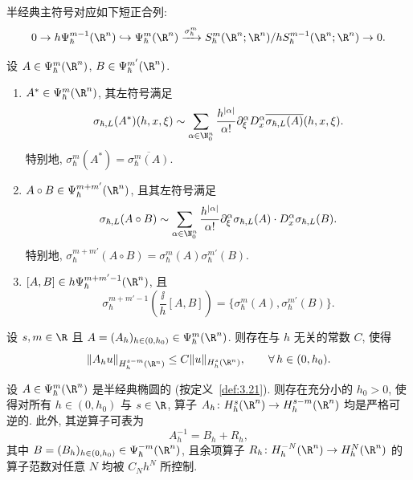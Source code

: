 半经典主符号对应如下短正合列:
\begin{equation}\label{eq:4.146}
    0 \to h \Psi_\hbar^{m-1}(\R^n) \hookrightarrow \Psi_\hbar^m(\R^n) \xrightarrow{\sigma_\hbar^m} S_\hbar^m(\R^n; \R^n) / h S_\hbar^{m-1}(\R^n; \R^n) \to 0.
\end{equation}

\begin{theorem}\label{thm:4.50}
设 $A \in \Psi_\hbar^m(\R^n)$, $B \in \Psi_\hbar^{m'}(\R^n)$.
\begin{enumerate}
    \item $A^* \in \Psi_\hbar^m(\R^n)$, 其左符号满足
    \begin{equation}\label{eq:4.147}
        \sigma_{\hbar, L}(A^*)(h, x, \xi) \sim \sum_{\alpha \in \N_0^n} \frac{h^{|\alpha|}}{\alpha!} \partial_\xi^\alpha D_x^\alpha \overline{\sigma_{\hbar, L}(A)}(h, x, \xi).
    \end{equation}
    特别地, $\sigma_\hbar^m(A^*) = \overline{\sigma_\hbar^m(A)}$.
    \item $A \circ B \in \Psi_\hbar^{m+m'}(\R^n)$, 且其左符号满足
    \begin{equation}\label{eq:4.148}
        \sigma_{\hbar, L}(A \circ B) \sim \sum_{\alpha \in \N_0^n} \frac{h^{|\alpha|}}{\alpha!} \partial_\xi^\alpha \sigma_{\hbar, L}(A) \cdot D_x^\alpha \sigma_{\hbar, L}(B).
    \end{equation}
    特别地, $\sigma_\hbar^{m+m'}(A \circ B) = \sigma_\hbar^m(A) \sigma_\hbar^{m'}(B)$.
    \item $[A, B] \in h \Psi_\hbar^{m+m'-1}(\R^n)$, 且
    \begin{equation}\label{eq:4.149}
        \sigma_\hbar^{m+m'-1}\left( \frac{\ii}{h} [A, B] \right) = \{\sigma_\hbar^m(A), \sigma_\hbar^{m'}(B)\}.
    \end{equation}
\end{enumerate}
\end{theorem}

\begin{theorem}\label{thm:4.51}
设 $s, m \in \R$ 且 $A = (A_h)_{h \in (0, h_0)} \in \Psi_\hbar^m(\R^n)$. 则存在与 $h$ 无关的常数 $C$, 使得
\begin{equation}\label{eq:4.150}
    \|A_h u\|_{H_h^{s-m}(\R^n)} \le C \|u\|_{H_h^s(\R^n)}, \qquad \forall\,h \in (0, h_0).
\end{equation}
\end{theorem}

\begin{theorem}[椭圆半经典伪微分算子的可逆性]\label{thm:4.52}
设 $A \in \Psi_\hbar^m(\R^n)$ 是半经典椭圆的 (按定义~\ref{def:3.21}). 则存在充分小的 $h_0 > 0$, 使得对所有 $h \in (0, h_0)$ 与 $s \in \R$, 算子 $A_h \colon H_h^s(\R^n) \to H_h^{s-m}(\R^n)$ 均是严格可逆的. 此外, 其逆算子可表为
\begin{equation}\label{eq:4.151}
    A_h^{-1} = B_h + R_h,
\end{equation}
其中 $B = (B_h)_{h \in (0, h_0)} \in \Psi_\hbar^{-m}(\R^n)$, 且余项算子 $R_h \colon H_h^{-N}(\R^n) \to H_h^N(\R^n)$ 的算子范数对任意 $N$ 均被 $C_N h^N$ 所控制.
\end{theorem}

